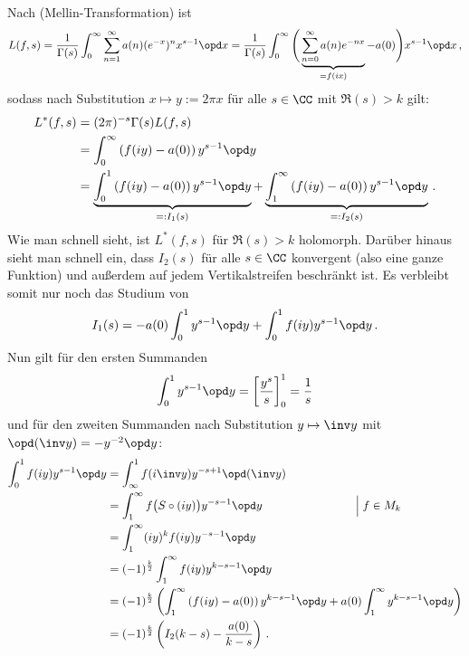 \begin{bewe}
Nach  (Mellin-Transformation) ist
\[
	L(f,s) 
	= \frac 1{\Gamma(s)} \int_0^\infty \sum_{n=1}^\infty a(n) (e^{-x})^n x^{s-1} \opd x
	= \frac 1{\Gamma(s)} \int_0^\infty \Bigg( \underbrace{\sum_{n=0}^\infty a(n) e^{-nx}}_{= f(ix)} - a(0) \Bigg) x^{s-1} \opd x
	\,,
\]
sodass nach Substitution $x \mapsto y := 2\pi x$ für alle $s \in \CC$ mit $\Re(s) > k$ gilt:
\begin{align*}
	L^*(f,s) 
	&= (2\pi)^{-s} \Gamma(s) L(f,s) \\
	&= \int_0^\infty \left( f(iy) - a(0) \right) y^{s-1} \opd y \\
	&= \underbrace{\int_0^1 \left( f(iy) - a(0) \right) y^{s-1} \opd y}_{=: I_1(s)} + \underbrace{\int_1^\infty \left( f(iy) - a(0) \right) y^{s-1} \opd y}_{=: I_2(s)}
	\,.
\end{align*}
Wie man schnell sieht, ist $L^*(f,s)$ für $\Re(s) > k$ holomorph. Darüber hinaus sieht man schnell ein, dass $I_2(s)$ für alle $s \in \CC$ konvergent (also eine ganze Funktion) und außerdem auf jedem Vertikalstreifen beschränkt ist. Es verbleibt somit nur noch das Studium von
\[
	I_1(s) = - a(0) \int_0^1 y^{s-1} \opd y + \int_0^1 f(iy) y^{s-1} \opd y
	\,.
\]
Nun gilt für den ersten Summanden
\[
	\int_0^1 y^{s-1} \opd y = \left[ \frac {y^s}s \right]_0^1 = \frac 1s
\]
und für den zweiten Summanden nach Substitution $y \mapsto \inv y$ mit $\opd (\inv y) = -y^{-2} \opd y$:
\begin{align*}
	\int_0^1 f(iy) y^{s-1} \opd y
	&= \int_\infty^1 f(i \inv y) y^{-s+1} \opd (\inv y) \\
	&= \int_1^\infty f \big( S \circ (iy) \big) y^{-s-1} \opd y \qquad \qquad \qquad \qquad \Big| \; f \in M_k \\
	&= \int_1^\infty (iy)^k f(iy) y^{-s-1} \opd y \\
	&= (-1)^{\frac k2} \int_1^\infty f(iy) y^{k-s-1} \opd y \\
	&= (-1)^{\frac k2} \left( \int_1^\infty \left( f(iy) - a(0) \right) y^{k-s-1} \opd y + a(0) \int_1^\infty y^{k-s-1} \opd y \right) \\
	&= (-1)^{\frac k2} \left( I_2(k-s) - \frac {a(0)}{k-s} \right)
	\,.
\end{align*}


\end{bewe}

